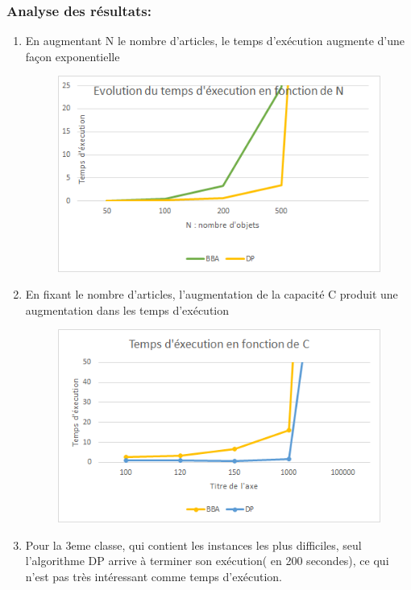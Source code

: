 \documentclass[12pt]{article}
\begin{document}
\subsubsection{Analyse des résultats:}
\begin{enumerate}
    \item En augmentant N le nombre d’articles, le temps d'exécution augmente d’une façon exponentielle
    \begin{figure}[H]
        \includegraphics[width=13.5cm]{../figures/graph2.png}
    \end{figure}
    \item En fixant le nombre d’articles, l’augmentation de la capacité C produit une augmentation dans les temps d’exécution
    \begin{figure}[H]
        \includegraphics[width=13.5cm]{../figures/graph3.png}
    \end{figure}
    \item Pour la 3eme classe, qui contient les instances les plus difficiles, seul l’algorithme DP arrive à terminer son exécution( en 200 secondes), ce qui n’est pas très intéressant comme temps d'exécution.
\end{enumerate}
\end{document}
